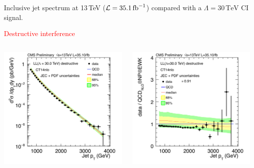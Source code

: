\documentclass[t,professionalfonts,handout, xcolor=pdftex,dvipsnames,table]{beamer}
\begin{document}
\begin{frame}
Inclusive jet spectrum at 13\,TeV (${\cal L} = 35.1\,\textrm{fb}^{-1}$) compared with a $\Lambda = 30\,\textrm{TeV}$ CI signal.

\medskip

\textcolor{red}{Destructive interference}

\medskip

\begin{columns}[T]

\begin{column}{0.49\textwidth}
\centerline{\includegraphics[width=\textwidth]{xsection_LL_d.png}}
\end{column}

\begin{column}{0.49\textwidth}
\includegraphics[width=\textwidth]{xsection_LL_ratio_d.png}
\end{column}


\end{columns}
\end{frame}
\end{document}
